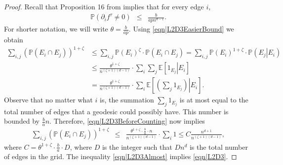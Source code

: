 \documentclass[reqno]{amsart}
\begin{document}
\begin{proof} 
Recall that Proposition 16 %
 from \cite{FirstPaper2025} implies that for every edge $i$,
\begin{eqnarray}
\mathbb P\left(\partial_if^{\tau}\neq 0\right)&\leq& \frac{b}{apn^{d-1}}. \label{eqn|L2D3EasierBound}
\end{eqnarray}
For shorter notation, we will write $\theta=\frac{b}{ap}$.
Using \eqref{eqn|L2D3EasierBound} we obtain
\begin{align}
\sum_{i,j}\left(\mathbb P(E_i\cap E_j)\right)^{1+\zeta}&\leq\sum_{i,j}\mathbb P(E_i)^{\zeta}\cdot \mathbb P(E_i\cap E_j)  =\sum_{i,j}\mathbb P(E_i)^{1+\zeta}\cdot \mathbb P\left(\left. E_j\right|E_i\right) \nonumber \\ 
&\leq  \frac{\theta^{1+\zeta}}{n^{(\zeta +1)(d-1)}}\cdot
\sum_i\sum_j\mathbb E\left[\left.1_{E_j}\right|E_i\right]\nonumber \\
&= \frac{\theta^{1+\zeta}}{n^{(\zeta +1)(d-1)}}\cdot \sum_i\mathbb E\left[\left.\left(\sum_j1_{E_j}\right)\right|E_i\right]. 
\label{eqn|L2D3BeforeCounting}
\end{align}
Observe that no matter what $i$ is, the summation $\sum_j1_{E_j}$ is at most equal to the total number of edges that a geodesic could possibly have. This number is bounded by $\frac ban$. Therefore, \eqref{eqn|L2D3BeforeCounting} now implies
\begin{eqnarray}\sum_{i,j}\left(\mathbb P(E_i\cap E_j)\right)^{1+\zeta}&\leq&
\frac{\theta^{1+\zeta}\cdot\frac ba\cdot n}{n^{(\zeta +1)(d-1)}}\cdot \sum_i1\leq C\frac{n^{d+1}}{n^{(\zeta +1)(d-1)}}, \label{eqn|L2D3Almost}
\end{eqnarray}
where $C=\theta^{1+\zeta}\cdot \frac ba\cdot D$, where $D$ is the integer such that $Dn^d$ is the total number of edges in the grid. The inequality \eqref{eqn|L2D3Almost} implies 
\eqref{eqn|L2D3}.


\end{proof}
\end{document}
